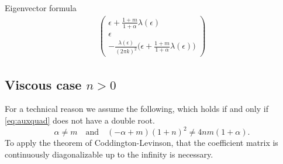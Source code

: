 \documentclass[a4paper,11pt]{article}
\def\blue{\color{blue}}
\theoremstyle{remark}
\begin{document}
{\blue Eigenvector formula
\begin{align*}
 \begin{pmatrix}
  \epsilon+ \frac{1+m}{1+\alpha}\lambda(\epsilon) \\ \epsilon \\ -\frac{\lambda(\epsilon)}{(2\pi k)^2} \Big(\epsilon + \frac{1+m}{1+\alpha}\lambda(\epsilon)\Big)
 \end{pmatrix}
\end{align*}
}

\subsection{Viscous case $n>0$}
For a technical reason we assume the following, which holds if and only if \eqref{eq:auxquad} does not have a double root.
 \begin{equation}
  \alpha\ne m \quad \text{and} \quad (-\alpha+m)(1+n)^2 \ne 4nm(1+\alpha). \tag{$A0$} \label{eq:nodoubleroot}
\end{equation}
To apply the theorem of Coddington-Levinson, that the coefficient matrix is continuously diagonalizable up to the infinity is necessary.
\end{document}

